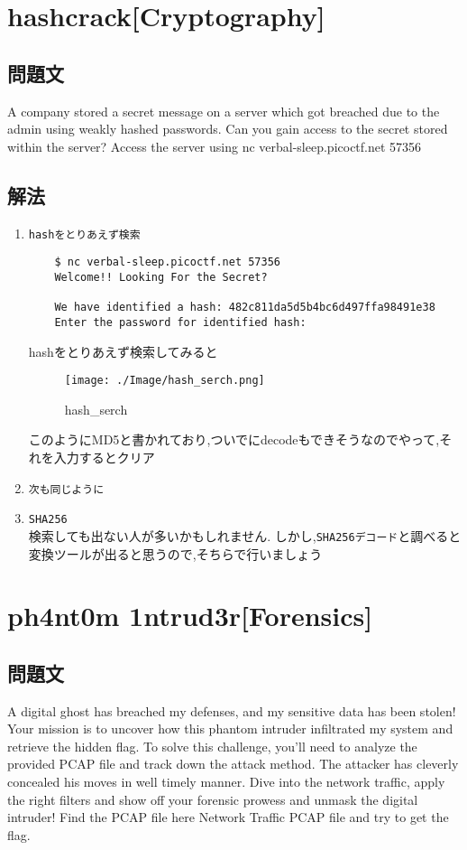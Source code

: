 \documentclass[dvipdfmx]{jsarticle}
\begin{document}
\section{hashcrack[Cryptography]}
\subsection{問題文}
A company stored a secret message on a server which got breached due to the admin using weakly hashed passwords. Can you gain access to the secret stored within the server? Access the server using nc verbal-sleep.picoctf.net 57356

\subsection{解法}
\begin{enumerate}
	\item \texttt{hashをとりあえず検索}
	\begin{verbatim}
	$ nc verbal-sleep.picoctf.net 57356
	Welcome!! Looking For the Secret?

	We have identified a hash: 482c811da5d5b4bc6d497ffa98491e38
	Enter the password for identified hash: 
	\end{verbatim}
	hashをとりあえず検索してみると
	\begin{figure}[h]
	\begin{center}
	\texttt{[image: ./Image/hash\_serch.png]}
	\caption{hash\_serch}
	\end{center}
	\end{figure}
	\FloatBarrier
	このようにMD5と書かれており,ついでにdecodeもできそうなのでやって,それを入力するとクリア
	\item \texttt{次も同じように}
	\item \texttt{SHA256}\\
	検索しても出ない人が多いかもしれません.
	しかし,\texttt{SHA256デコード}と調べると変換ツールが出ると思うので,そちらで行いましょう

\end{enumerate}

\section{ph4nt0m 1ntrud3r[Forensics]}
\subsection{問題文}
A digital ghost has breached my defenses, and my sensitive data has been stolen!  Your mission is to uncover how this phantom intruder infiltrated my system and retrieve the hidden flag. To solve this challenge, you'll need to analyze the provided PCAP file and track down the attack method. The attacker has cleverly concealed his moves in well timely manner. Dive into the network traffic, apply the right filters and show off your forensic prowess and unmask the digital intruder! Find the PCAP file here Network Traffic PCAP file and try to get the flag. 
\end{document}
